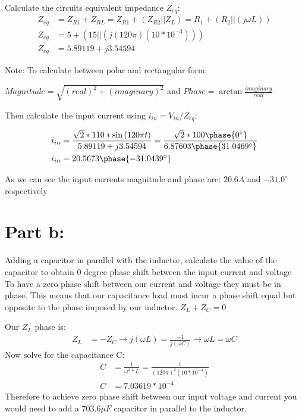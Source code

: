 \documentclass{article}
\begin{document}
Calculate the circuits equivalent impedance $Z_{eq}$:
\begin{align*}
    Z_{eq} & = Z_{R1} + Z_{RL} = Z_{R1} + (Z_{R2} || Z_{L}) = R_1 + (R_2 || (j \omega L)) \\
    Z_{eq} & = 5 + ( 15 || (j (120 \pi)(10 * 10^{-3})) ) \\
    Z_{eq} & = 5.89119 + j 3.54594
\end{align*}

Note: To calculate between polar and rectangular form: 
\begin{center}
    $Magnitude = \sqrt{(real)^2 + (imaginary)^2}$ and $Phase = \arctan{\frac{imaginary}{real}}$
\end{center}

Then calculate the input current using $i_{in} = V_{in} / Z_{eq}$:

\begin{align*}
    i_{in} &= \frac{\sqrt{2}*110*\sin{(120\pi t)}}{5.89119 + j 3.54594} = \frac{\sqrt{2}*100 \phase{0^{\circ}} }{6.87603 \phase{31.0469^{\circ}}}\\
    i_{in} & = 20.5673  \phase{-31.0439^{\circ}} 
\end{align*}

As we can see the input currents magnitude and phase are: $20.6A$ and ${-31.0^{\circ}}$ respectively

\section*{Part b:}
Adding a capacitor in parallel with the inductor, calculate the value of the capacitor to obtain 0 degree phase shift between the input current and voltage \\

To have a zero phase shift between our current and voltage they must be in phase. This means that our capacitance load must incur a phase shift equal but opposite to the phase imposed by our inductor. $Z_L + Z_C = 0$

Our $Z_L$ phase is:
\begin{align*}
    Z_L &= -Z_C \rightarrow
    j(\omega L) = \frac{-1}{j (\omega C)}  \rightarrow
    \omega L =\omega C
\end{align*}
Now solve for the capacitance C:
\begin{align*}
    C &= \frac{1}{\omega^2 * L} =\frac{1}{(120 \pi)^2(10*10^{-3})}\\
    C &= 7.03619 * 10 ^{-4}
\end{align*}
Therefore to achieve zero phase shift between our input voltage and current you would need to add a $703.6 \mu F$ capacitor in parallel to the inductor.
\end{document}
